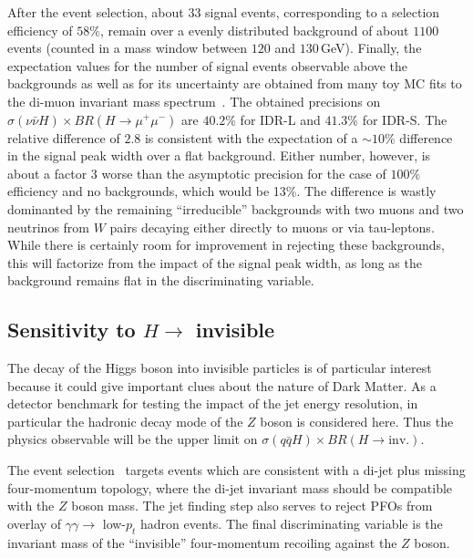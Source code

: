 After the event selection, about $33$ signal events, corresponding to a selection efficiency of $58\%$, remain over a evenly distributed background of about $1100$ events (counted in a mass window between $120$ and $130$\,GeV). Finally, the expectation values for the number of signal events observable above the backgrounds as well as for its uncertainty are obtained from many toy MC fits to the di-muon invariant mass spectrum~\cite{ILDNote:Hmumu}. The obtained precisions on $\sigma(\nu\bar{\nu} H)\times BR(H\to \mu^+\mu^-)$ are $40.2$\% for IDR-L and $41.3$\% for IDR-S. The relative difference of $2.8$ is consistent with the expectation of a $\sim 10\%$ difference in the signal peak width over a flat background. Either number, however, is about a factor $3$ worse than the asymptotic precision for the case of $100\%$ efficiency and no backgrounds, which would be 13\%. The difference is wastly dominanted by the remaining ``irreducible'' backgrounds with two muons and two neutrinos from $W$ pairs decaying either directly to muons or via tau-leptons. While there is certainly room for improvement in rejecting these backgrounds, this will factorize from the impact of the signal peak width, as long as the background remains flat in the discriminating variable. 
 


\subsection{Sensitivity to \texorpdfstring{$H \to $ invisible}{H -> invisible}}

The decay of the Higgs boson into invisible particles is of particular interest because
it could give important clues about the nature of Dark Matter. As a detector benchmark for testing the impact of the jet energy resolution, in particular the hadronic decay mode of the $Z$ boson is considered here. Thus the physics observable will be the upper limit on $\sigma(q\bar{q} H)\times BR(H \to \mbox{inv.})$.

The event selection~\cite{ILDNote:Hinv} targets events which are consistent with  a di-jet plus missing four-momentum topology, where the di-jet invariant mass should be compatible with the $Z$ boson mass. The jet finding step also serves to reject PFOs from overlay of $\gamma\gamma \to $ low-$p_t$ hadron events. The final discriminating variable is the
invariant mass of the ``invisible'' four-momentum recoiling against the $Z$ boson. 


